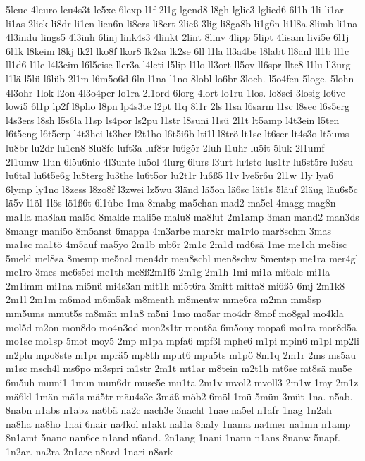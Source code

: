 {5leuc 4leuro leu4s3t le5xe 6lexp l1f 2l1g lgend8 l8gh lglie3 lglied6
6l1h 1li li1ar li1as 2lick li8dr li1en lien6n li8ers li8ert 2lie\ss
 3lig li8ga8b li1g6n li1l8a 8limb li1na 4l3indu lings5
4l3inh 6linj link4s3 4linkt 2lint 8linv 
4lipp 5lipt 4lisam
livi5e 6l1j 6l1k l8keim l8kj lk2l lko8f lkor8 lk2sa lk2se 6ll l1la
ll3a4be l8labt ll8anl ll1b ll1c ll1d6 l1le l4l3eim l6l5eise ller3a
l4leti l5lip l1lo ll3ort ll5ov ll6spr llte8 l1lu ll3urg l1l\"a
l5l\"u l6l\"ub 2l1m l6m5o6d 6ln l1na l1no 8lobl lo6br 3loch.
l5o4fen 5loge.  5lohn 4l3ohr 1lok l2on 4l3o4per lo1ra 2l1ord 6lorg
4lort lo1ru 1los.  lo8sei 3losig lo6ve lowi5 6l1p lp2f l8pho l8pn
lp4s3te l2pt l1q 8l1r 2ls l1sa l6sarm l1sc l8sec l6s5erg l4s3ers l8sh
l5s6la l1sp ls4por ls2pu l1str l8suni l1s\"u 2l1t lt5amp l4t3ein
l5ten l6t5eng l6t5erp l4t3hei lt3her l2t1ho l6t5i6b lti1l l8tr\"o
lt1sc lt6ser lt4s3o lt5ums lu8br lu2dr lu1en8 8lu8fe luft3a luf8tr
lu6g5r 2luh l1uhr lu5it 5luk 2l1umf 2l1umw 1lun 6l5u6nio 4l3unte lu5ol
4lurg 6lurs l3urt lu4sto 
lus1tr %
lu6st5re lu8su lu6tal lu6t5e6g lu8terg
lu3the lu6t5or lu2t1r lu6\ss5  l1v lve5r6u 2l1w 1ly lya6
6lymp ly1no l8zess l8zo8f l3zwei lz5wu 3l\"and l\"a5on
l\"a6sc l\"at1s 5l\"auf 2l\"aug l\"au6s5c l\"a5v
l1\"ol 1l\"os l\"o1\ss6t  6l1\"ube 1ma
8mabg ma5chan mad2 ma5el 4magg mag8n ma1la ma8lau mal5d 8malde mali5e
malu8 ma8lut 2m1amp 3man mand2 man3ds 8mangr mani5o 8m5anst 6mappa
4m3arbe mar8kr ma1r4o mar8schm 3mas ma1sc ma1t\"o 4m5auf ma5yo 2m1b
mb6r 2m1c 2m1d md6s\"a 1me me1ch me5isc 5meld mel8sa 8memp me5nal
men4dr men8schl men8schw 8mentsp me1ra mer4gl me1ro 3mes me6s5ei me1th
me8\ss  2m1f6 2m1g 2m1h 1mi mi1a mi6ale mi1la 2m1imm mi1na
mi5n\"u mi4s3an mit1h mi5t6ra 3mitt mitta8 mi6\ss5  6mj
2m1k8 2m1l 2m1m m6mad m6m5ak m8menth m8mentw mme6ra m2mn mm5sp mm5ums
mmut5s m8m\"an m1n8 m5ni 1mo mo5ar mo4dr 8mof mo8gal mo4kla mol5d
m2on mon8do mo4n3od 
mon2s1tr %
mont8a 6m5ony mopa6 mo1ra mor8d5a mo1sc mo1sp 5mot
moy5 2mp m1pa mpfa6 mpf3l mphe6 m1pi mpin6 m1pl mp2li m2plu mpo8ste
m1pr mpr\"a5 mp8th mput6 mpu5ts m1p\"o 8m1q 2m1r 2ms ms5au m1sc
msch4l ms6po m3spri m1str 2m1t mt1ar m8tein m2t1h mt6se mt8s\"a
mu5e 6m5uh mumi1 1mun mun6dr muse5e mu1ta 2m1v mvol2 mvoll3 2m1w 1my
2m1z m\"a6kl 1m\"an m\"a1s m\"a5tr m\"au4s3c 3m\"a\ss
 m\"ob2 6m\"ol 1m\"u 5m\"un 3m\"ut 1na.
n5ab.  8nabn n1abs n1abz na6b\"a na2c nach3e 3nacht 1nae na5el
n1afr 1nag 1n2ah na8ha na8ho 1nai 6nair na4kol n1akt nal1a 8naly 1nama
na4mer na1mn n1amp 8n1amt 5nanc nan6ce n1and n6and.  2n1ang 1nani
1nann n1ans 8nanw 5napf.  1n2ar.  na2ra 2n1arc n8ard 1nari n8ark
}

